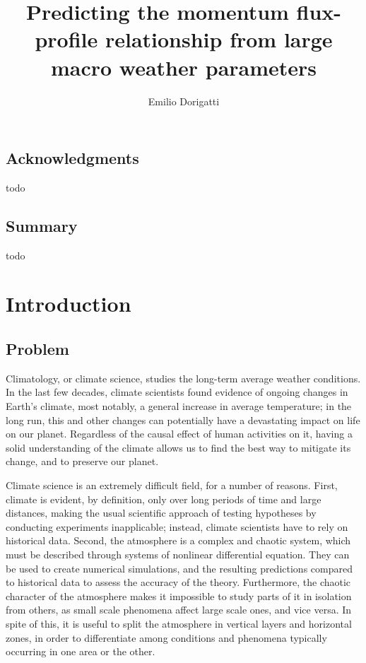 \documentclass[12pt]{book}
\begin{document}
\title{Predicting the momentum flux-profile relationship from large macro weather parameters}
\author{Emilio Dorigatti}

\maketitle


\section*{Acknowledgments}
todo

\newpage

\section*{Summary}
todo

\tableofcontents

\listoffigures

\listoftables

\chapter{Introduction}

\section{Problem}

Climatology, or climate science, studies the long-term average weather conditions. In the last few decades, climate scientists found evidence of ongoing changes in Earth's climate, most notably, a general increase in average temperature; in the long run, this and other changes can potentially have a devastating impact on life on our planet. Regardless of the causal effect of human activities on it, having a solid understanding of the climate allows us to find the best way to mitigate its change, and to preserve our planet.

Climate science is an extremely difficult field, for a number of reasons. First, climate is evident, by definition, only over long periods of time and large distances, making the usual scientific approach of testing hypotheses by conducting experiments inapplicable; instead, climate scientists have to rely on historical data. Second, the atmosphere is a complex and chaotic system, which must be described through systems of nonlinear differential equation. They can be used to create numerical simulations, and the resulting predictions compared to historical data to assess the accuracy of the theory. Furthermore, the chaotic character of the atmosphere makes it impossible to study parts of it in isolation from others, as small scale phenomena affect large scale ones, and vice versa. In spite of this, it is useful to split the atmosphere in vertical layers and horizontal zones, in order to differentiate among conditions and phenomena typically occurring in one area or the other.
\end{document}
